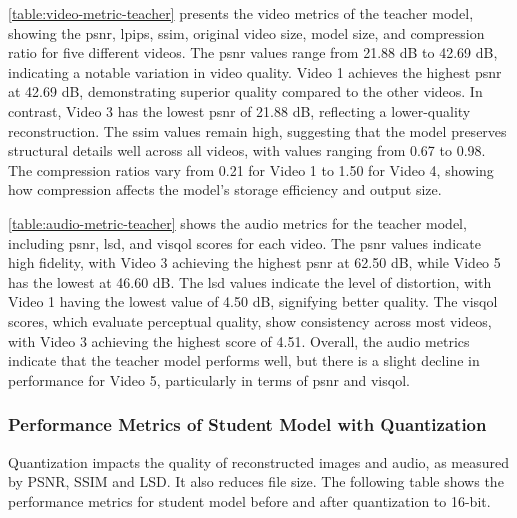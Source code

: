 \documentclass{ioereport}
\begin{document}
    \autoref{table:video-metric-teacher} presents the video metrics of the teacher model, showing the \gls{psnr}, \gls{lpips}, \gls{ssim}, original video size, model size, and compression ratio for five different videos. The \gls{psnr} values range from 21.88 dB to 42.69 dB, indicating a notable variation in video quality. Video 1 achieves the highest \gls{psnr} at 42.69 dB, demonstrating superior quality compared to the other videos. In contrast, Video 3 has the lowest \gls{psnr} of 21.88 dB, reflecting a lower-quality reconstruction. The \gls{ssim} values remain high, suggesting that the model preserves structural details well across all videos, with values ranging from 0.67 to 0.98. The compression ratios vary from 0.21 for Video 1 to 1.50 for Video 4, showing how compression affects the model's storage efficiency and output size.

    \autoref{table:audio-metric-teacher} shows the audio metrics for the teacher model, including \gls{psnr}, \gls{lsd}, and \gls{visqol} scores for each video. The \gls{psnr} values indicate high fidelity, with Video 3 achieving the highest \gls{psnr} at 62.50 dB, while Video 5 has the lowest at 46.60 dB. The \gls{lsd} values indicate the level of distortion, with Video 1 having the lowest value of 4.50 dB, signifying better quality. The \gls{visqol} scores, which evaluate perceptual quality, show consistency across most videos, with Video 3 achieving the highest score of 4.51. Overall, the audio metrics indicate that the teacher model performs well, but there is a slight decline in performance for Video 5, particularly in terms of \gls{psnr} and \gls{visqol}.


\subsubsection{Performance Metrics of Student Model with Quantization}
    Quantization impacts the quality of reconstructed images and audio, as measured by PSNR, SSIM and LSD. It also reduces file size. The following table shows the performance metrics for student model before and after quantization to 16-bit.
\end{document}
